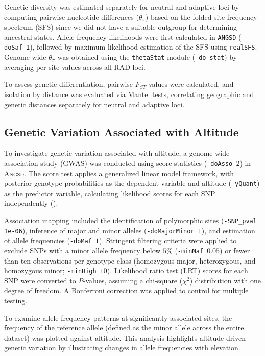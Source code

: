 \documentclass[9pt,a4paper,twoside]{rho-class/rho}
\begin{document}
        Genetic diversity was estimated separately for neutral and adaptive loci by computing pairwise nucleotide differences ($\theta_{\pi}$) based on the folded site frequency spectrum (SFS) since we did not have a suitable outgroup for determining ancestral states. Allele frequency likelihoods were first calculated in \texttt{ANGSD} (\texttt{-doSaf 1}), followed by maximum likelihood estimation of the SFS using \texttt{realSFS}. Genome-wide $\theta_{\pi}$ was obtained using the \texttt{thetaStat} module (\texttt{-do\_stat}) by averaging per-site values across all RAD loci.

        To assess genetic differentiation, pairwise $F_{ST}$ values were calculated, and isolation by distance was evaluated via Mantel tests, correlating geographic and genetic distances separately for neutral and adaptive loci.


    \subsection{Genetic Variation Associated with Altitude}
    
        To investigate genetic variation associated with altitude, a genome-wide association study (GWAS) was conducted using score statistics (\texttt{-doAsso $2$}) in \textsc{Angsd}. The score test applies a generalized linear model framework, with posterior genotype probabilities as the dependent variable and altitude (\texttt{-yQuant}) as the predictor variable, calculating likelihood scores for each SNP independently (\cite{Skotte2012}).

        Association mapping included the identification of polymorphic sites (\texttt{-SNP\_pval 1e-06}), inference of major and minor alleles (\texttt{-doMajorMinor $1$}), and estimation of allele frequencies (\texttt{-doMaf $1$}). Stringent filtering criteria were applied to exclude SNPs with a minor allele frequency below $5\%$ (\texttt{-minMaf $0.05$}) or fewer than ten observations per genotype class (homozygous major, heterozygous, and homozygous minor; \texttt{-minHigh $10$}). Likelihood ratio test (LRT) scores for each SNP were converted to \textit{P}-values, assuming a chi-square ($\chi^2$) distribution with one degree of freedom. A Bonferroni correction was applied to control for multiple testing.
        
        To examine allele frequency patterns at significantly associated sites, the frequency of the reference allele (defined as the minor allele across the entire dataset) was plotted against altitude. This analysis highlights altitude-driven genetic variation by illustrating changes in allele frequencies with elevation.
\end{document}
